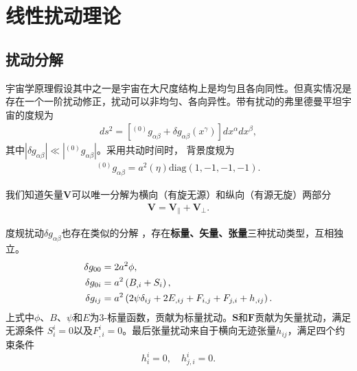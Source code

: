 \section{线性扰动理论}
% 

\subsection{扰动分解}
宇宙学原理假设其中之一是宇宙在大尺度结构上是均匀且各向同性。但真实情况是存在一个一阶扰动修正，扰动可以非均匀、各向异性。带有扰动的弗里德曼平坦宇宙的度规为
\begin{align}
	\label{eq:perturbation-metric}
	ds^2=\left[^{(0)}g_{\alpha\beta}+\delta g_{\alpha\beta}(x^{\gamma})
	\right]dx^{\alpha}dx^{\beta},
\end{align}
其中$|\delta g_{\alpha\beta}|\ll|^{(0)}g_{\alpha\beta}|$。采用共动时间时，
背景度规为
\begin{align}
	\label{eq:background-metric}
	^{(0)}g_{\alpha\beta}=a^2(\eta)\text{diag}(1, -1, -1, -1).
\end{align}

我们知道矢量$\bm{V}$可以唯一分解为横向（有旋无源）和纵向（有源无旋）两部分
\begin{align}
  \label{eq:composition-of-vector}
  \bm{V}=\bm{V}_{\parallel}+\bm{V}_{\bot}.
\end{align}

度规扰动$\delta
g_{\alpha\beta}$也存在类似的分解\citep{york1974covariant,deser1967covariant}
，存在\textbf{标量、矢量、张量}三种扰动类型，互相独立。
\begin{align}
\label{eq:decomposition-of-metric}
\delta g_{00} &= 2a^2\phi, \\
\delta g_{0i} &= a^2\left(B_{,i}+S_{i}\right), \\
\delta g_{ij}&= a^2
\left(2\psi \delta_{ij}+2E_{,ij}+F_{i,j}+F_{j,i}+h_{,ij}\right).
\end{align}
上式中$\phi$、$B$、$\psi$和$E$为3-标量函数，贡献为标量扰动。$\bm{S}$和$\bm{F}$贡献为矢量扰动，满足无源条件
$S^{i}_{i}=0$以及$F^{i}_{,i}=0$。最后张量扰动来自于横向无迹张量$h_{ij}$，满足四个约束条件
\begin{equation}
  \label{eq:traceless-transerse-tensor-perturbation}
  h^{i}_{i}=0,\quad h^{i}_{j,i}=0.
\end{equation}

